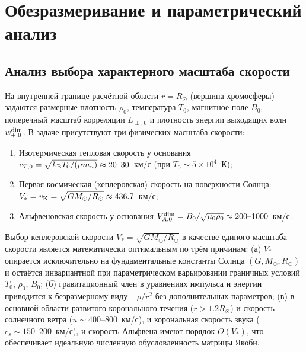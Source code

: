 \documentclass[11pt,a4paper]{article}
\begin{document}
\section{Обезразмеривание и параметрический анализ}

\subsection{Анализ выбора характерного масштаба скорости}

На внутренней границе расчётной области $r = R_\odot$ (вершина хромосферы) задаются размерные плотность $\rho_0$, температура $T_0$, магнитное поле $B_0$, поперечный масштаб корреляции $L_{\perp,0}$ и плотность энергии выходящих волн $w_{+,0}^{\rm dim}$. В задаче присутствуют три физических масштаба скорости:
\begin{enumerate}
\item Изотермическая тепловая скорость у основания $c_{T,0} = \sqrt{k_{\rm B}T_0/(\mu m_u)} \approx 20\text{--}30$~км/с (при $T_0 \sim 5\times 10^4$~К);
\item Первая космическая (кеплеровская) скорость на поверхности Солнца: $V_* = v_{\rm K} = \sqrt{GM_\odot/R_\odot} \approx 436.7$~км/с;
\item Альфвеновская скорость у основания $V_{A,0}^{\rm dim} = B_0/\sqrt{\mu_0\rho_0} \approx 200\text{--}1000$~км/с.
\end{enumerate}
Выбор кеплеровской скорости $V_* = \sqrt{GM_\odot/R_\odot}$ в качестве единого масштаба скорости является математически оптимальным по трём причинам: (а) $V_*$ опирается исключительно на фундаментальные константы Солнца $(G, M_\odot, R_\odot)$ и остаётся инвариантной при параметрическом варьировании граничных условий $T_0$, $\rho_0$, $B_0$; (б) гравитационный член в уравнениях импульса и энергии приводится к безразмерному виду $-\rho/r^2$ без дополнительных параметров; (в) в основной области развитого коронального течения ($r > 1.2 R_\odot$) и скорость солнечного ветра ($u \sim 400\text{--}800$~км/с), и корональная скорость звука ($c_s \sim 150\text{--}200$~км/с), и скорость Альфвена имеют порядок $O(V_*)$, что обеспечивает идеальную численную обусловленность матрицы Якоби.
\end{document}
